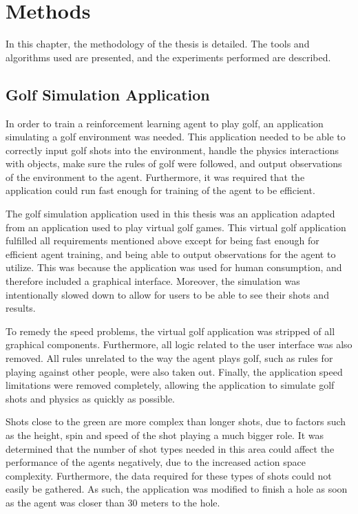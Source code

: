 \documentclass{kththesis}
\begin{document}
\chapter{Methods}
\label{chapter:methods}
In this chapter, the methodology of the thesis is detailed. The tools and algorithms used are presented, and the experiments performed are described. 

\section{Golf Simulation Application}
\label{sec:simulation}
In order to train a reinforcement learning agent to play golf, an application simulating a golf environment was needed. This application needed to be able to correctly input golf shots into the environment, handle the physics interactions with objects, make sure the rules of golf were followed, and output observations of the environment to the agent. Furthermore, it was required that the application could run fast enough for training of the agent to be efficient.

The golf simulation application used in this thesis was an application adapted from an application used to play virtual golf games. This virtual golf application fulfilled all requirements mentioned above except for being fast enough for efficient agent training, and being able to output observations for the agent to utilize. This was because the application was used for human consumption, and therefore included a graphical interface. Moreover, the simulation was intentionally slowed down to allow for users to be able to see their shots and results. 

To remedy the speed problems, the virtual golf application was stripped of all graphical components. Furthermore, all logic related to the user interface was also removed. All rules unrelated to the way the agent plays golf, such as rules for playing against other people, were also taken out. Finally, the application speed limitations were removed completely, allowing the application to simulate golf shots and physics as quickly as possible.

Shots close to the green are more complex than longer shots, due to factors such as the height, spin and speed of the shot playing a much bigger role. It was determined that the number of shot types needed in this area could affect the performance of the agents negatively, due to the increased action space complexity. Furthermore, the data required for these types of shots could not easily be gathered. As such, the application was modified to finish a hole as soon as the agent was closer than 30 meters to the hole.
\end{document}
